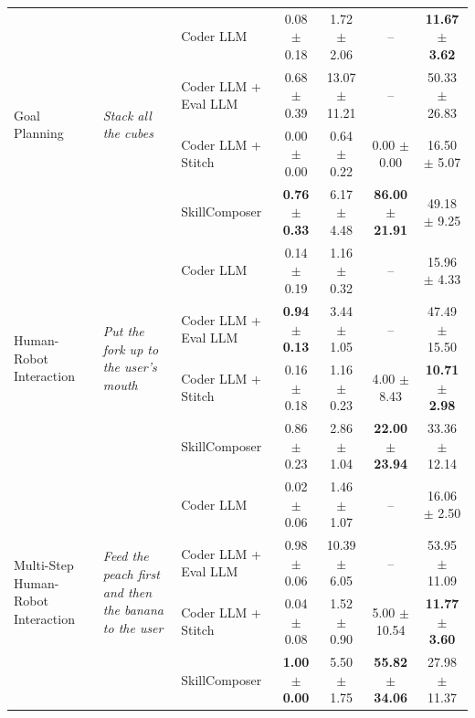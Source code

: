 \begin{table}[t]
{\begin{tabular}{lllcccc}
\midrule
\multirow{4}{*}{Goal Planning} & \multirow{4}{*}{\parbox{3cm}{\raggedright\emph{Stack all the cubes}}} & Coder LLM & 0.08 $\pm$ 0.18 & 1.72 $\pm$ 2.06 & -- & \textbf{11.67 $\pm$ 3.62} \\
 &  & Coder LLM + Eval LLM & 0.68 $\pm$ 0.39 & 13.07 $\pm$ 11.21 & -- & 50.33 $\pm$ 26.83 \\
 &  & Coder LLM + Stitch & 0.00 $\pm$ 0.00 & 0.64 $\pm$ 0.22 & 0.00 $\pm$ 0.00 & 16.50 $\pm$ 5.07 \\
 &  & SkillComposer & \textbf{0.76 $\pm$ 0.33} & 6.17 $\pm$ 4.48 & \textbf{86.00 $\pm$ 21.91} & 49.18 $\pm$ 9.25 \\
\midrule
\multirow{4}{*}{Human-Robot Interaction} & \multirow{4}{*}{\parbox{3cm}{\raggedright\emph{Put the fork up to the user's mouth}}} & Coder LLM & 0.14 $\pm$ 0.19 & 1.16 $\pm$ 0.32 & -- & 15.96 $\pm$ 4.33 \\
 &  & Coder LLM + Eval LLM & \textbf{0.94 $\pm$ 0.13} & 3.44 $\pm$ 1.05 & -- & 47.49 $\pm$ 15.50 \\
 &  & Coder LLM + Stitch & 0.16 $\pm$ 0.18 & 1.16 $\pm$ 0.23 & 4.00 $\pm$ 8.43 & \textbf{10.71 $\pm$ 2.98} \\
 &  & SkillComposer & 0.86 $\pm$ 0.23 & 2.86 $\pm$ 1.04 & \textbf{22.00 $\pm$ 23.94} & 33.36 $\pm$ 12.14 \\
\midrule
\multirow{4}{*}{Multi-Step Human-Robot Interaction} & \multirow{4}{*}{\parbox{3cm}{\raggedright\emph{Feed the peach first and then the banana to the user}}} & Coder LLM & 0.02 $\pm$ 0.06 & 1.46 $\pm$ 1.07 & -- & 16.06 $\pm$ 2.50 \\
 &  & Coder LLM + Eval LLM & 0.98 $\pm$ 0.06 & 10.39 $\pm$ 6.05 & -- & 53.95 $\pm$ 11.09 \\
 &  & Coder LLM + Stitch & 0.04 $\pm$ 0.08 & 1.52 $\pm$ 0.90 & 5.00 $\pm$ 10.54 & \textbf{11.77 $\pm$ 3.60} \\
 &  & SkillComposer & \textbf{1.00 $\pm$ 0.00} & 5.50 $\pm$ 1.75 & \textbf{55.82 $\pm$ 34.06} & 27.98 $\pm$ 11.37 \\
\bottomrule
\end{tabular}%
}
\end{table}